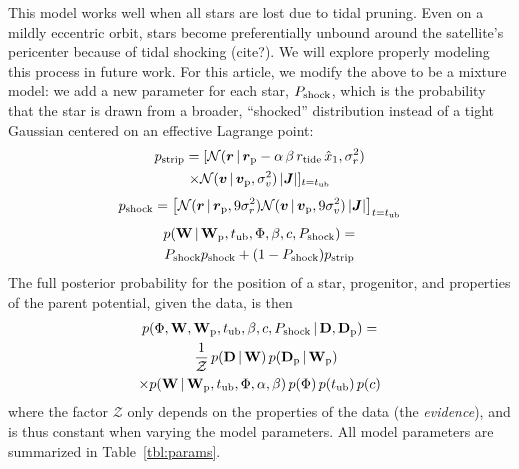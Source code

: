 \documentclass[letterpaper,12pt,preprint]{aastex}
\newcommand{\given}{\,|\,}
\newcommand{\D}{{\bf D}}
\newcommand{\W}{{\bf W}}
\newcommand{\J}{{\boldsymbol J}}
\newcommand{\rtide}{r_{\rm tide}}
\newcommand{\bs}{\boldsymbol}
\newcommand{\sat}{{\rm p}}
\newcommand{\tub}{t_{\rm ub}}
\newcommand{\tailbit}{\beta}
\newcommand{\Loffset}{\alpha}
\begin{document}
This model works well when all stars are lost due to tidal pruning. Even on a mildly eccentric orbit, stars become preferentially unbound around the satellite's pericenter because of tidal shocking (cite?). We will explore properly modeling this process in future work. For this article, we modify the above to be a mixture model: we add a new parameter for each star, $P_{\rm shock}$, which is the probability that the star is drawn from a broader, ``shocked'' distribution instead of a tight Gaussian centered on an effective Lagrange point:
\begin{multline}
	p_{\rm strip} = [ \mathcal{N}(\bs{r} \given \bs{r}_\sat - \Loffset\,\tailbit\,\rtide\,\hat{x}_1, \sigma^2_r)\\
		\times \mathcal{N}(\bs{v} \given \bs{v}_\sat, \sigma^2_v) \left\vert\J\right\vert ]_{t=\tub}
\end{multline}
\begin{align}
	p_{\rm shock} = \left [ \mathcal{N}(\bs{r} \given \bs{r}_\sat, 9\sigma^2_r)\mathcal{N}(\bs{v} \given \bs{v}_\sat, 9\sigma^2_v) \left\vert\J\right\vert\right]_{t=\tub}
\end{align}
\begin{multline}
	p(\W \given \W_\sat, \tub, \Phi, \tailbit, c, P_{\rm shock}) = \\
		P_{\rm shock}p_{\rm shock} + (1-P_{\rm shock})p_{\rm strip}
\end{multline}
The full posterior probability for the position of a star, progenitor, and properties of the parent potential, given the data, is then
\begin{multline}
	p(\Phi, \W, \W_\sat, \tub, \tailbit, c, P_{\rm shock} \given \D, \D_\sat) = \\
		\shoveleft{\hspace{3em}\frac{1}{\mathcal{Z}} \, p(\D \given \W) \, p(\D_\sat \given \W_\sat)}\\
			\times p(\W \given \W_\sat, \tub, \Phi, \Loffset, \tailbit) \, 
			p(\Phi) \, p(\tub) \, p(c)
\end{multline}
where the factor $\mathcal{Z}$ only depends on the properties of the data (the \emph{evidence}), and is thus constant when varying the model parameters. All model parameters are summarized in Table~\ref{tbl:params}.

\end{document}
